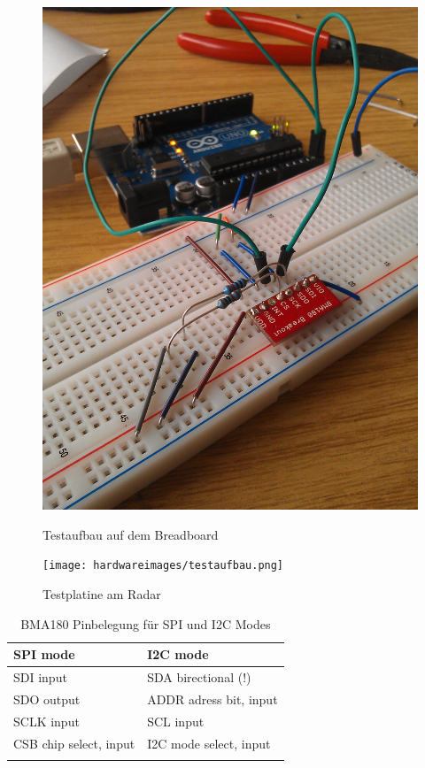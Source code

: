 \documentclass[12pt,a4paper]{scrartcl}
\begin{document}
\begin{figure}[htb]
\begin{minipage}[H]{8cm}
	\centering
	\includegraphics[scale=.111]{hardwareimages/breadboard.jpg}
	\caption{Testaufbau auf dem Breadboard}
	\label{breadboard}
\end{minipage}
\hfill
\begin{minipage}[H]{8cm}
	\centering
	\texttt{[image: hardwareimages/testaufbau.png]}
	\caption{Testplatine am Radar}
	\label{testaufbau}
\end{minipage}
\end{figure}



\begin{table}[htb]
\begin{tabular}{@{}ll@{}}
      
      \cmidrule(r){1-2}\morecmidrules\cmidrule(r){1-2}
       SPI mode & I2C mode\\
      \midrule
 SDI input & SDA birectional (!) \\ 
 SDO output & ADDR adress bit, input \\
 SCLK input & SCL input \\
 CSB chip select, input & I2C mode select, input \\
   \addlinespace
   \bottomrule
 \end{tabular}
\caption{BMA180 Pinbelegung für SPI und I2C Modes \citep{Sensortec:2009rt}}
\label{i2cmode}
\end{table}
\end{document}
